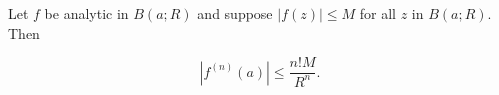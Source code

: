Let $f$ be analytic in $B(a; R)$ and suppose $|f(z)| \leq M$ for all $z$ in $B(a; R)$. Then

$$|f^{(n)}(a)| \leq \frac{n! M}{R^n}.$$
